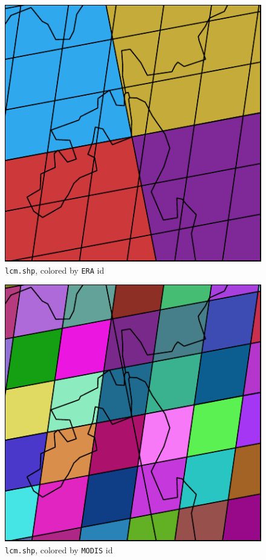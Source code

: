 \documentclass[twoside,a4paper]{refart}
\begin{document}
\begin{figure}
\includegraphics{thumbs/lcm_era}
\caption{\texttt{lcm.shp}, colored by \texttt{ERA} id}
\end{figure}

\begin{figure}
\includegraphics{thumbs/lcm_modis}
\caption{\texttt{lcm.shp}, colored by \texttt{MODIS} id}
\end{figure}
\end{document}
